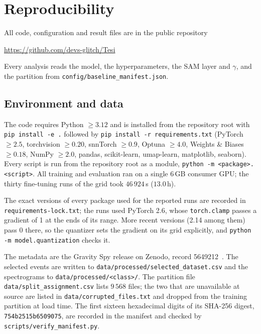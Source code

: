 \chapter{Reproducibility}
\label{app:reproducibility}

All code, configuration and result files are in the public repository
\begin{center}\url{https://github.com/devs-glitch/Tesi}\end{center}
Every analysis reads the model, the hyperparameters, the SAM layer and $\gamma$,
and the partition from \texttt{config/baseline\_manifest.json}.

\section{Environment and data}

The code requires Python $\geq 3.12$ and is installed from the repository root
with \texttt{pip install -e .} followed by \texttt{pip install -r
requirements.txt} (PyTorch $\geq 2.5$, torchvision $\geq 0.20$, snnTorch $\geq
0.9$, Optuna $\geq 4.0$, Weights \& Biases $\geq 0.18$, NumPy $\geq 2.0$,
pandas, scikit-learn, umap-learn, matplotlib, seaborn). Every script is run
from the repository root as a module, \texttt{python -m
<package>.<script>}. All training and evaluation ran on a single 6\,GB consumer
GPU; the thirty fine-tuning runs of the grid took $46\,924$\,s ($13.0$\,h).

The exact versions of every package used for the reported runs are recorded in
\texttt{requirements-lock.txt}; the runs used PyTorch 2.6, whose
\texttt{torch.clamp} passes a gradient of 1 at the ends of its range. More recent
versions (2.14 among them) pass 0 there, so the quantizer sets the gradient on
its grid explicitly, and \texttt{python -m model.quantization} checks it.

The metadata are the Gravity Spy release on Zenodo, record
5649212~\cite{glanzer2021}. The selected events are written to
\texttt{data/processed/selected\_dataset.csv} and the spectrograms to
\texttt{data/processed/<class>/}. The partition file
\texttt{data/split\_assignment.csv} lists $9\,568$ files; the two that are
unavailable at source are listed in \texttt{data/corrupted\_files.txt} and
dropped from the training partition at load time. The first sixteen hexadecimal
digits of its SHA-256 digest, \texttt{754b2515b6509075}, are recorded in the
manifest and checked by \texttt{scripts/verify\_manifest.py}.

